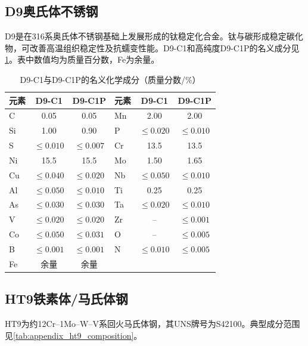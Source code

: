 \subsection{D9奥氏体不锈钢}

D9是在316系奥氏体不锈钢基础上发展形成的钛稳定化合金。钛与碳形成稳定碳化物，可改善高温组织稳定性及抗蠕变性能。D9-C1和高纯度D9-C1P的名义成分见\tablename\ref{tab:appendix_d9_composition}\cite{hofmanMetallicFuelsHandbook2019}。表中数值均为质量百分数，Fe为余量。

\begin{table}[htbp]
	\centering
	\caption{D9-C1与D9-C1P的名义化学成分（质量分数/\%）}
	\label{tab:appendix_d9_composition}
	
	\begin{tabular*}{\textwidth}{
			@{\extracolsep{\fill}}
			lcc lcc
			@{}
		}
		\toprule
		元素 & D9-C1 & D9-C1P & 元素 & D9-C1 & D9-C1P \\
		\midrule
		C  & 0.05 & 0.05 & Mn & 2.00 & 2.00 \\
		Si & 1.00 & 0.90 & P  & $\leq0.020$ & $\leq0.010$ \\
		S  & $\leq0.010$ & $\leq0.007$ & Cr & 13.5 & 13.5 \\
		Ni & 15.5 & 15.5 & Mo & 1.50 & 1.65 \\
		Cu & $\leq0.040$ & $\leq0.020$ & Nb & $\leq0.050$ & $\leq0.010$ \\
		Al & $\leq0.050$ & $\leq0.010$ & Ti & 0.25 & 0.25 \\
		As & $\leq0.030$ & $\leq0.030$ & Ta & $\leq0.020$ & $\leq0.010$ \\
		V  & $\leq0.020$ & $\leq0.020$ & Zr & -- & $\leq0.001$ \\
		Co & $\leq0.050$ & $\leq0.031$ & O  & -- & $\leq0.005$ \\
		B  & $\leq0.001$ & $\leq0.001$ & N  & $\leq0.010$ & $\leq0.005$ \\
		Fe & 余量 & 余量 & & & \\
		\bottomrule
	\end{tabular*}
\end{table}

\subsection{HT9铁素体/马氏体钢}

HT9为约12Cr--1Mo--W--V系回火马氏体钢，其UNS牌号为S42100。典型成分范围见\tablename\ref{tab:appendix_ht9_composition}\cite{hofmanMetallicFuelsHandbook2019}。

